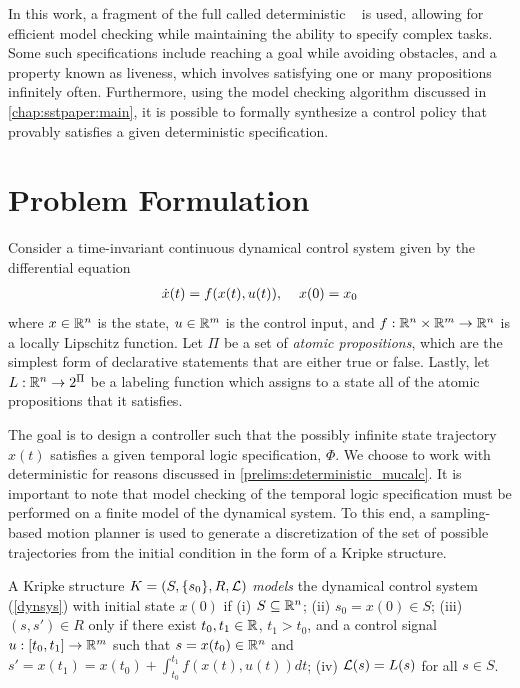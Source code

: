 In this work, a fragment of the full \mucalc{} called deterministic \mucalc{}~\cite{Karaman2009} is used, allowing for efficient model checking while maintaining the ability to specify complex tasks. Some such specifications include reaching a goal while avoiding obstacles, and a property known as liveness, which involves satisfying one or many propositions infinitely often. Furthermore, using the model checking algorithm discussed in \autoref{chap:sstpaper:main}, it is possible to formally synthesize a control policy that provably satisfies a given deterministic \mucalc{} specification.


\section{Problem Formulation}

Consider a time-invariant continuous dynamical control system given by the differential equation
\begin{align}\label{dynsys}
    \dot x(t) = f(x(t),u(t)), \hspace{4mm} x(0) = x_0
\end{align}
where $x \in \mathbb{R}^n$ is the state, $u \in \mathbb{R}^m$ is the control input, and 
$f: \mathbb{R}^n \times \mathbb{R}^m \to \mathbb{R}^n$ is a locally Lipschitz function. Let $\Pi$ be a set of {\em atomic propositions}, which are the simplest form of declarative statements that are either true or false. Lastly, let $L: \mathbb{R}^n \to 2^\Pi$ be a labeling function which assigns to a state all of the atomic propositions that it satisfies.

The goal is to design a controller such that the possibly infinite state trajectory $x(t)$ satisfies a given temporal logic specification, $\Phi$. We choose to work with deterministic \mucalc{} for reasons discussed in \autoref{prelims:deterministic_mucalc}. It is important to note that model checking of the temporal logic specification must be performed on a finite model of the dynamical system. To this end, a sampling-based motion planner is used to generate a discretization of the set of possible trajectories from the initial condition in the form of a Kripke structure.

\begin{defn}
    A Kripke structure $K = (S, \{s_0\}, R, \mathcal{L})$ \emph{models} the dynamical control system (\ref{dynsys}) with initial state $x(0)$ if (i) $S \subseteq \mathbb{R}^n$; (ii) $s_0 = x(0) \in S$; (iii) $(s,s') \in R$ only if there exist $t_0, t_1 \in \mathbb{R}$, $t_1 > t_0$, and a control signal $u: [t_0, t_1] \to \mathbb{R}^m$ such that $s = x(t_0) \in \mathbb{R}^n$ and $s' = x(t_1) = x(t_0) + \int_{t_0}^{t_1} f(x(t), u(t)) dt$; (iv) $\mathcal{L}(s) = L(s)$ for all $s \in S$.
\end{defn}


